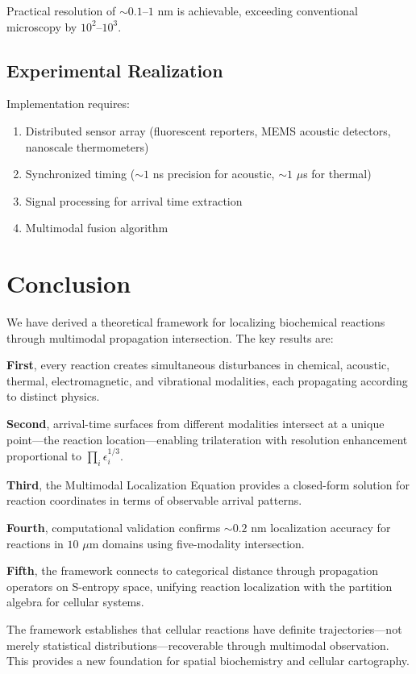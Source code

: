 \documentclass[11pt,a4paper]{article}
\theoremstyle{remark}
\begin{document}
Practical resolution of $\sim 0.1$--$1$ nm is achievable, exceeding conventional microscopy by $10^2$--$10^3$.

\subsection{Experimental Realization}

Implementation requires:
\begin{enumerate}
    \item Distributed sensor array (fluorescent reporters, MEMS acoustic detectors, nanoscale thermometers)
    \item Synchronized timing ($\sim 1$ ns precision for acoustic, $\sim 1$ $\mu$s for thermal)
    \item Signal processing for arrival time extraction
    \item Multimodal fusion algorithm
\end{enumerate}

\section{Conclusion}

We have derived a theoretical framework for localizing biochemical reactions through multimodal propagation intersection. The key results are:

\textbf{First}, every reaction creates simultaneous disturbances in chemical, acoustic, thermal, electromagnetic, and vibrational modalities, each propagating according to distinct physics.

\textbf{Second}, arrival-time surfaces from different modalities intersect at a unique point---the reaction location---enabling trilateration with resolution enhancement proportional to $\prod_i \epsilon_i^{1/3}$.

\textbf{Third}, the Multimodal Localization Equation provides a closed-form solution for reaction coordinates in terms of observable arrival patterns.

\textbf{Fourth}, computational validation confirms $\sim 0.2$ nm localization accuracy for reactions in $10$ $\mu$m domains using five-modality intersection.

\textbf{Fifth}, the framework connects to categorical distance through propagation operators on S-entropy space, unifying reaction localization with the partition algebra for cellular systems.

The framework establishes that cellular reactions have definite trajectories---not merely statistical distributions---recoverable through multimodal observation. This provides a new foundation for spatial biochemistry and cellular cartography.



\end{document}
